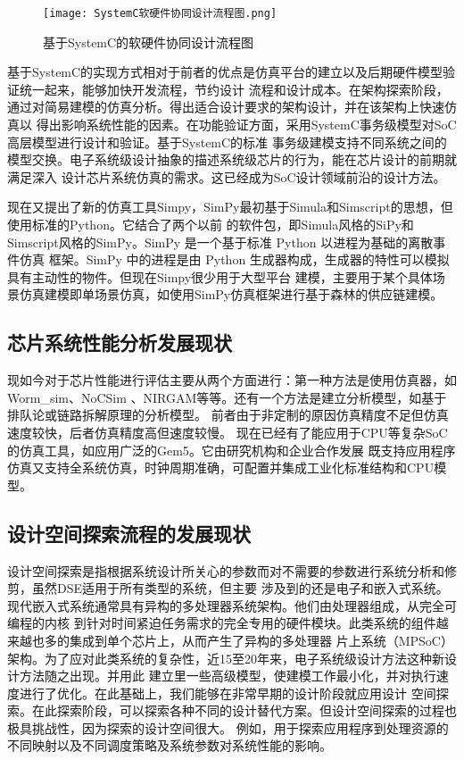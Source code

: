 \begin{figure}
    \centering
    \texttt{[image: SystemC软硬件协同设计流程图.png]}
    \caption{基于SystemC的软硬件协同设计流程图}
    \label{fig:badge}
\end{figure}

基于SystemC的实现方式相对于前者的优点是仿真平台的建立以及后期硬件模型验证统一起来，能够加快开发流程，节约设计
流程和设计成本。在架构探索阶段，通过对简易建模的仿真分析。得出适合设计要求的架构设计，并在该架构上快速仿真以
得出影响系统性能的因素。在功能验证方面，采用SystemC事务级模型对SoC高层模型进行设计和验证\cite{8}。基于SystemC的标准
事务级建模支持不同系统之间的模型交换。电子系统级设计抽象的描述系统级芯片的行为，能在芯片设计的前期就满足深入
设计芯片系统仿真的需求\cite{9}。这已经成为SoC设计领域前沿的设计方法。

现在又提出了新的仿真工具Simpy，SimPy最初基于Simula和Simscript的思想，但使用标准的Python。它结合了两个以前
的软件包，即Simula风格的SiPy和Simscript风格的SimPy。SimPy 是一个基于标准 Python 以进程为基础的离散事件仿真
框架。SimPy 中的进程是由 Python 生成器构成，生成器的特性可以模拟具有主动性的物件。但现在Simpy很少用于大型平台
建模，主要用于某个具体场景仿真建模即单场景仿真\cite{10}，如使用SimPy仿真框架进行基于森林的供应链建模\cite{11}。
\subsection{芯片系统性能分析发展现状}
现如今对于芯片性能进行评估主要从两个方面进行：第一种方法是使用仿真器，如Worm\_sim、NoCSim
、NIRGAM等等。还有一个方法是建立分析模型，如基于排队论或链路拆解原理的分析模型\cite{39}。
前者由于非定制的原因仿真精度不足但仿真速度较快，后者仿真精度高但速度较慢。
现在已经有了能应用于CPU等复杂SoC的仿真工具，如应用广泛的Gem5\cite{12}。它由研究机构和企业合作发展
既支持应用程序仿真又支持全系统仿真，时钟周期准确，可配置并集成工业化标准结构和CPU模型。
\subsection{设计空间探索流程的发展现状}
设计空间探索是指根据系统设计所关心的参数而对不需要的参数进行系统分析和修剪\cite{13}，虽然DSE适用于所有类型的系统，但主要
涉及到的还是电子和嵌入式系统。现代嵌入式系统通常具有异构的多处理器系统架构。他们由处理器组成，从完全可编程的内核
到针对时间紧迫任务需求的完全专用的硬件模块。此类系统的组件越来越也多的集成到单个芯片上，从而产生了异构的多处理器
片上系统（MPSoC）架构\cite{14}。为了应对此类系统的复杂性，近15至20年来，电子系统级设计方法这种新设计方法随之出现。并用此
建立里一些高级模型，使建模工作最小化，并对执行速度进行了优化。在此基础上，我们能够在非常早期的设计阶段就应用设计
空间探索。在此探索阶段，可以探索各种不同的设计替代方案。但设计空间探索的过程也极具挑战性，因为探索的设计空间很大。
例如，用于探索应用程序到处理资源的不同映射\cite{15}以及不同调度策略及系统参数对系统性能的影响。

